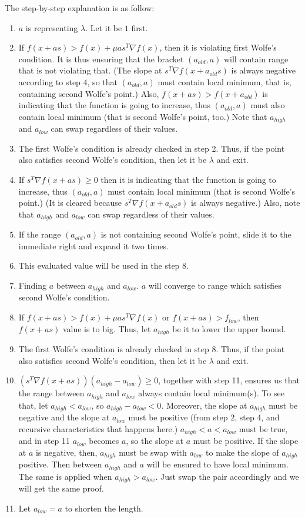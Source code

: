 \documentclass{article}
\begin{document}
The step-by-step explanation is as follow:
\begin{enumerate}
    \item $a$ is representing $\lambda$. Let it be $1$ first.
    \item If $f(x + as) > f(x) + \mu a s^T \nabla f(x)$, then it is violating first Wolfe's condition. It is thus ensuring that the bracket $(a_{old},a)$ will contain range that is not violating that. (The slope at $s^T \nabla f(x + a_{old}s)$ is always negative according to step 4, so that $(a_{old},a)$ must contain local minimum, that is, containing second Wolfe's point.) Also, $f(x + a s) > f(x + a_{old})$ is indicating that the function is going to increase, thus $(a_{old},a)$ must also contain local minimum (that is second Wolfe's point, too.) Note that $a_{high}$ and $a_{low}$ can swap regardless of their values.
    \item The first Wolfe's condition is already checked in step 2. Thus, if the point also satisfies second Wolfe's condition, then let it be $\lambda$ and exit.
    \item If $s^T \nabla f(x + as) \geq 0$ then it is indicating that the function is going to increase, thus $(a_{old},a)$ must contain local minimum (that is second Wolfe's point.) (It is cleared because $s^T \nabla f(x + a_{old}s)$ is always negative.) Also, note that $a_{high}$ and $a_{low}$ can swap regardless of their values.
    \item If the range $(a_{old},a)$ is not containing second Wolfe's point, slide it to the immediate right and expand it two times.
    \item This evaluated value will be used in the step 8.
    \item Finding $a$ between $a_{high}$ and $a_{low}$. $a$ will converge to range which satisfies second Wolfe's condition.
    \item If $f(x + as) > f(x) + \mu a s^T \nabla f(x)$ or $f(x + a s) > f_{low}$, then $f(x + a s)$ value is to big. Thus, let $a_{high}$ be it to lower the upper bound.
    \item The first Wolfe's condition is already checked in step 8. Thus, if the point also satisfies second Wolfe's condition, then let it be $\lambda$ and exit.
    \item $(s^T \nabla f(x + as))(a_{high} - a_{low}) \geq 0$, together with step 11, ensures us that the range between $a_{high}$ and $a_{low}$ always contain local minimum(s). To see that, let $a_{high} < a_{low}$, so $a_{high} - a_{low} < 0$. Moreover, the slope at $a_{high}$ must be negative and the slope at $a_{low}$ must be positive (from step 2, step 4, and recursive characteristics that happens here.) $a_{high} < a < a_{low}$ must be true, and in step 11 $a_{low}$ becomes $a$, so the slope at $a$ must be positive. If the slope at $a$ is negative, then, $a_{high}$ must be swap with $a_{low}$ to make the slope of $a_{high}$ positive. Then  between $a_{high}$ and $a$ will be ensured to have local minimum. The same is applied when $a_{high} > a_{low}$. Just swap the pair accordingly and we will get the same proof.
    \item Let $a_{low} = a$ to shorten the length.
\end{enumerate}
\end{document}
